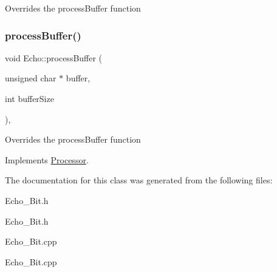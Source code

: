 Overrides the process\+Buffer function \mbox{\label{classEcho_ae915d9d4065a34411d18791a5ae9006b}} 
\subsubsection{\texorpdfstring{process\+Buffer()}{processBuffer()}\hspace{0.1cm}{\footnotesize\ttfamily [2/2]}}
{\footnotesize\ttfamily void Echo\+::process\+Buffer (\begin{DoxyParamCaption}\item[{unsigned char $\ast$}]{buffer,  }\item[{int}]{buffer\+Size }\end{DoxyParamCaption})\hspace{0.3cm}{\ttfamily [override]}, {\ttfamily [virtual]}}

Overrides the process\+Buffer function 

Implements \hyperlink{classProcessor}{Processor}.



The documentation for this class was generated from the following files\+:\begin{DoxyCompactItemize}
\item 
Echo\+\_\+Bit.\+h\item 
Echo\+\_\+Bit.\+h\item 
Echo\+\_\+Bit.\+cpp\item 
Echo\+\_\+Bit.\+cpp\end{DoxyCompactItemize}
